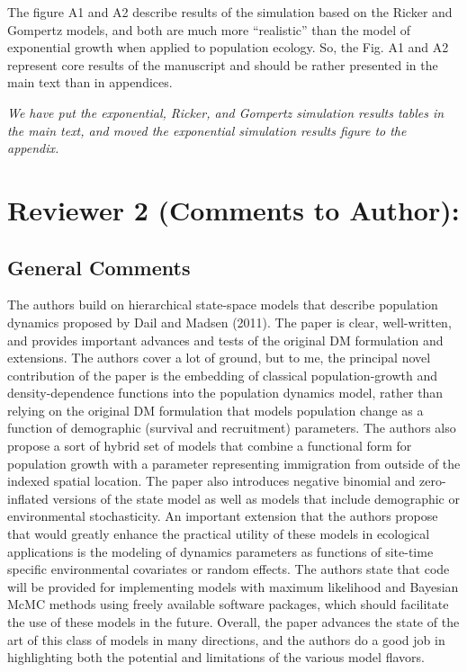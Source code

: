 \documentclass[12pt,english]{article}
\begin{document}
\begin{spacing}{1.9}
\begin{flushleft}
\vspace{0.5cm}

The figure A1 and A2 describe results of the simulation based on the Ricker and Gompertz
models, and both are much more ``realistic'' than the model of exponential growth when
applied to population ecology. So, the Fig. A1 and A2 represent core results of the
manuscript and should be rather presented in the main text than in appendices.

\vspace{0.5cm}
\textit{We have put the exponential, Ricker, and Gompertz simulation results tables in the 
main text, and moved the exponential simulation results figure to the appendix.}
\vspace{0.5cm}


\section*{Reviewer 2 (Comments to Author):} 
\label{sec:rev2}
\subsection*{General Comments}
The authors build on hierarchical state-space models that describe population
dynamics proposed by Dail and Madsen (2011). The paper is clear, well-written,
and provides important advances and tests of the original DM formulation and
extensions. The authors cover a lot of ground, but to me, the principal novel
contribution of the paper is the embedding of classical population-growth and
density-dependence functions into the population dynamics model, rather than
relying on the original DM formulation that models population change as a
function of demographic (survival and recruitment) parameters. The authors also
propose a sort of hybrid set of models that combine a functional form for
population growth with a parameter representing immigration from outside of the
indexed spatial location. The paper also introduces negative binomial and
zero-inflated versions of the state model as well as models that include
demographic or environmental stochasticity. An important extension that
the authors propose that would greatly enhance the practical utility of these
models in ecological applications is the modeling of dynamics parameters as
functions of site-time specific environmental covariates or random effects. The
authors state that code will be provided for implementing models with maximum
likelihood and Bayesian McMC methods using freely available software packages,
which should facilitate the use of these models in the future. Overall, the
paper advances the state of the art of this class of models in many directions,
and the authors do a good job in highlighting both the potential and limitations
of the various model flavors.


\end{flushleft}
\end{spacing}
\end{document}
